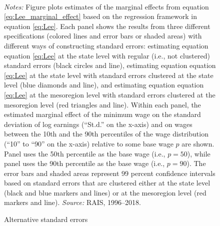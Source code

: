 \begin{figure}[!htb]
  \centering
  \caption{\label{app_fig_alt_ses}Alternative standard errors}
  \prefigvspace
  \hspace*{\fill}%
  \centerhfill[\qquad\qquad\qquad\qquad\qquad]
  \hspace*{\fill}
  \\
  \postfigvspace
  \begin{minipage}[t]{1\columnwidth}%
    \begin{spacing}{0.75}
      \emph{\scriptsize{}Notes:}{\scriptsize{} Figure plots estimates of the marginal effects from equation \eqref{eq:Lee_marginal_effect} based on the regression framework in equation \eqref{eq:Lee}. Each panel shows the results from three different specifications (colored lines and error bars or shaded areas) with different ways of constructing standard errors: estimating equation equation \eqref{eq:Lee} at the state level with regular (i.e., not clustered) standard errors (black circles and line), estimating equation equation \eqref{eq:Lee} at the state level with standard errors clustered at the state level (blue diamonds and line), and estimating equation equation \eqref{eq:Lee} at the mesoregion level with standard errors clustered at the mesoregion level (red triangles and line). Within each panel, the estimated marginal effect of the minimum wage on the standard deviation of log earnings (``St.d.'' on the x-axis) and on wages between the 10th and the 90th percentiles of the wage distribution (``10'' to ``90'' on the x-axis) relative to some base wage $p$ are shown. Panel  uses the 50th percentile as the base wage (i.e., $p=50$), while panel  uses the 90th percentile as the base wage (i.e., $p=90$). The error bars and shaded areas represent 99 percent confidence intervals based on standard errors that are clustered either at the state level (black and blue markers and lines) or at the mesoregion level (red markers and line). %
      \emph{\scriptsize{}Source: } RAIS, 1996--2018.}
    \end{spacing}
  \end{minipage}
\end{figure}




